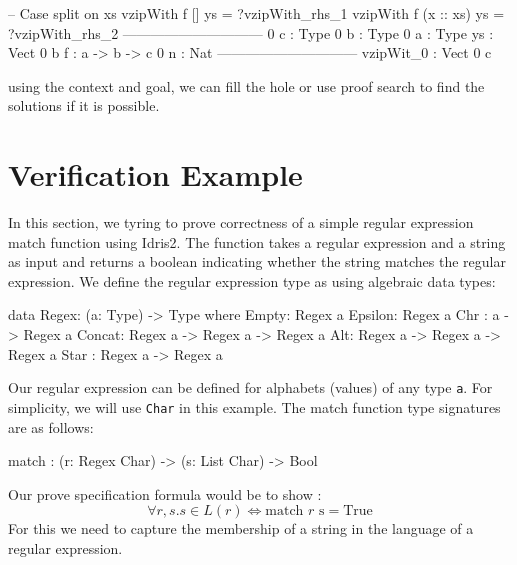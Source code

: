 \documentclass[]{rptuseminar}
\begin{document}
\begin{idris}  
-- Case split on xs
vzipWith f [] ys = ?vzipWith_rhs_1
vzipWith f (x :: xs) ys = ?vzipWith_rhs_2
------------------------------
 0 c : Type
 0 b : Type
 0 a : Type
   ys : Vect 0 b
   f : a -> b -> c
 0 n : Nat
------------------------------
vzipWit_0 : Vect 0 c

\end{idris}
using the context and goal, we can fill the hole or use proof search to find the solutions if it is possible.

\section{Verification Example}  
\label{sec:verification-example}  
In this section, we tyring to prove correctness of a simple regular expression match function using Idris2. The function takes a regular expression and a string as input and returns a boolean indicating whether the string matches the regular expression.
We define the regular expression type as using algebraic data types:
\begin{idris}
  data Regex: (a: Type) -> Type where
  Empty: Regex a
  Epsilon: Regex a
  Chr : a -> Regex a
  Concat: Regex a -> Regex a -> Regex a
  Alt:  Regex a -> Regex a -> Regex a
  Star :  Regex a -> Regex a
\end{idris}
Our regular expression can be defined for alphabets (values) of any type \texttt{a}. For simplicity, we will use \texttt{Char} in this example.
The match function type signatures are as follows:
\begin{idris}
  match : (r: Regex Char) -> (s: List Char) -> Bool
\end{idris}
Our prove specification formula would be to show :
\begin{equation}
  \forall r, s. s \in L(r) \Leftrightarrow \text{match } r \text{ s} = \text{True}
\end{equation}
For this we need to capture the membership of a string in the language of a regular expression.
\end{document}
